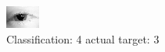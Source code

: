 \begin{figure}[h!]
\begin{center}
\includegraphics[width=0.60\columnwidth]{figures/ID121_class_4_target_3.png}
\end{center}
\caption{ Classification: 4 actual target: 3}
\label{fig:ID121_class_4_target_3}
\end{figure}
